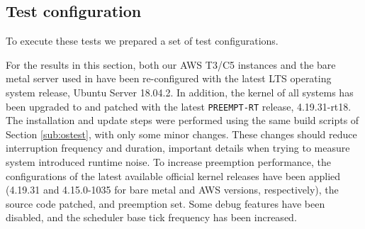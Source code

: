 \documentclass[]{scrartcl}
\begin{document}



%
%
%
%
%
%



\subsection{Test configuration}

To execute these tests we prepared a set of test configurations. 

For the results in this section, both our AWS T3/C5 instances and the bare metal server used in \cite{Hoferetal2019} have been re-configured with the latest LTS operating system release, Ubuntu Server 18.04.2.
In addition, the kernel of all systems has been upgraded to and patched with the latest \texttt{PREEMPT-RT} release, 4.19.31-rt18.
The installation and update steps were performed using the same build scripts of Section \ref{sub:ostest}, with only some minor changes.
These changes should reduce interruption frequency and duration, important details when trying to measure system introduced runtime noise.
To increase preemption performance, the configurations of the latest available official kernel releases have been applied (4.19.31 and 4.15.0-1035 for bare metal and AWS versions, respectively), the source code patched, and preemption set.
Some debug features have been disabled, and the scheduler base tick frequency has been increased.
\end{document}
